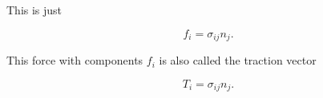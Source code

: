 This is just 

\begin{equation}\label{eqn:continuumL4:390}
\boxed{
f_i = \sigma_{ij} n_j.
}
\end{equation}

This force with components $f_i$ is also called the traction vector

\begin{equation}\label{eqn:continuumL4:410}
T_i = \sigma_{ij} n_j.
\end{equation}

\EndArticle

